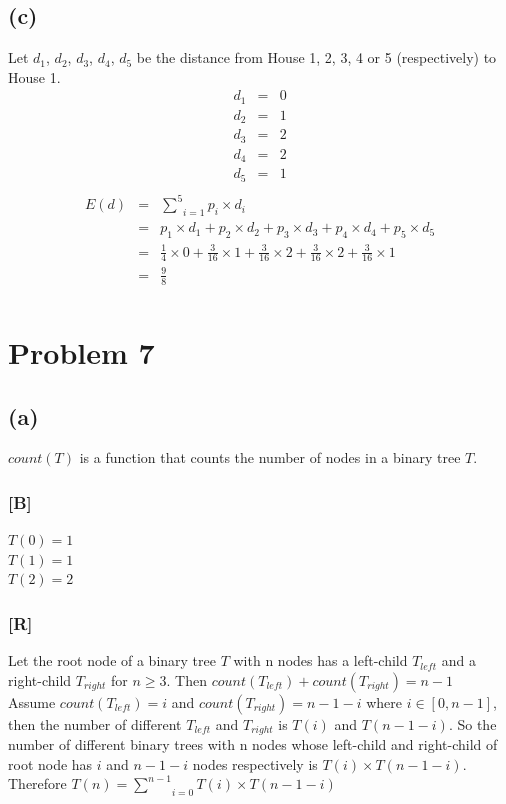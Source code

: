 \documentclass{article} %
\begin{document}
\subsection{(c)}
Let $d_1$, $d_2$, $d_3$, $d_4$, $d_5$ be the distance from House 1, 2, 3, 4 or 5 (respectively) to House 1.
\[\begin{array}{rcl}
    d_1 &=& 0\\
    d_2 &=& 1\\
    d_3 &=& 2\\
    d_4 &=& 2\\
    d_5 &=& 1\\
\end{array}\]
\[\begin{array}{rcl}
    E(d)    &=& \underset{i=1}{\overset{5}{\sum}} p_i\times d_i\\
            &=& p_1 \times d_1 + p_2 \times d_2 + p_3 \times d_3 + p_4 \times d_4 + p_5 \times d_5\\
            &=& \frac{1}{4} \times 0 + \frac{3}{16} \times 1 + \frac{3}{16} \times 2 + \frac{3}{16} \times 2 + \frac{3}{16} \times 1\\
            &=& \frac{9}{8}\\
\end{array}\]
\section*{Problem 7}
\subsection*{(a)}
$count(T)$ is a function that counts the number of nodes in a binary tree $T$.\\
\subsubsection*{[B]}
$T(0) = 1$\\
$T(1) = 1$\\
$T(2) = 2$\\
\subsubsection*{[R]}
Let the root node of a binary tree $T$ with n nodes has a left-child $T_{left}$ and a right-child $T_{right}$ for $n \geq 3$. Then $count(T_{left}) + count(T_{right}) = n - 1$\\
Assume $count(T_{left}) = i$ and $count(T_{right}) = n - 1 - i$ where $i \in [0, n-1]$, then the number of different $T_{left}$ and $T_{right}$ is $T(i)$ and $T(n - 1 -i)$. So the number of different binary trees with n nodes whose left-child and right-child of root node has $i$ and $n - 1 -i$ nodes respectively is $T(i) \times T(n - 1 - i)$.\\
Therefore $T(n) = \underset{i=0}{\overset{n-1}{\sum}}T(i) \times T(n-1-i)$\\
\end{document}
